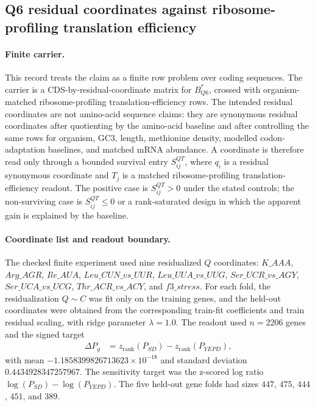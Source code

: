 \subsection{Q6 residual coordinates against ribosome-profiling translation efficiency}
\label{subsec:q6-ribosome-te-translation-survival-cross-layer}

\paragraph{Finite carrier.}
This record treats the claim as a finite row problem over coding sequences.  The carrier is a CDS-by-residual-coordinate matrix for $B^{*}_{Q6}$, crossed with organism-matched ribosome-profiling translation-efficiency rows.  The intended residual coordinates are not amino-acid sequence claims: they are synonymous residual coordinates after quotienting by the amino-acid baseline and after controlling the same rows for organism, GC3, length, methionine density, modelled codon-adaptation baselines, and matched mRNA abundance.  A coordinate is therefore read only through a bounded survival entry $S^{QT}_{ij}$, where $q_i$ is a residual synonymous coordinate and $T_j$ is a matched ribosome-profiling translation-efficiency readout.  The positive case is $S^{QT}_{ij} > 0$ under the stated controls; the non-surviving case is $S^{QT}_{ij} \leq 0$ or a rank-saturated design in which the apparent gain is explained by the baseline.

\paragraph{Coordinate list and readout boundary.}
The checked finite experiment used nine residualized $Q$ coordinates: $K\_AAA$, $Arg\_AGR$, $Ile\_AUA$, $Leu\_CUN\_vs\_UUR$, $Leu\_UUA\_vs\_UUG$, $Ser\_UCR\_vs\_AGY$, $Ser\_UCA\_vs\_UCG$, $Thr\_ACR\_vs\_ACY$, and $f3\_stress$.  For each fold, the residualization $Q \sim C$ was fit only on the training genes, and the held-out coordinates were obtained from the corresponding train-fit coefficients and train residual scaling, with ridge parameter $\lambda=1.0$.  The readout used $n=2206$ genes and the signed target
$$
\begin{aligned}
\Delta P_g &= z_{\mathrm{rank}}(P_{SD}) - z_{\mathrm{rank}}(P_{YEPD}),
\end{aligned}
$$
with mean $-1.1858399826713623\times 10^{-18}$ and standard deviation $0.4434928347257967$.  The sensitivity target was the z-scored log ratio $\log(P_{SD})-\log(P_{YEPD})$.  The five held-out gene folds had sizes $447$, $475$, $444$, $451$, and $389$.

